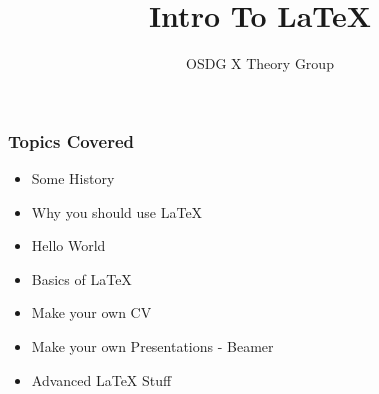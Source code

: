 \documentclass[hyperref={colorlinks=true,linkcolor=blue}]{beamer}
\title{Intro To \LaTeX}
\author{OSDG X Theory Group}
\begin{document}
\maketitle

\begin{frame}
    \frametitle{Topics Covered}
    \begin{itemize}
        \item Some History
        \item Why you should use LaTeX
        \item Hello World 
        \item Basics of LaTeX
        \item Make your own CV 
        \item Make your own Presentations - Beamer
        \item Advanced LaTeX Stuff
    \end{itemize}
\end{frame}








%
\end{document}
